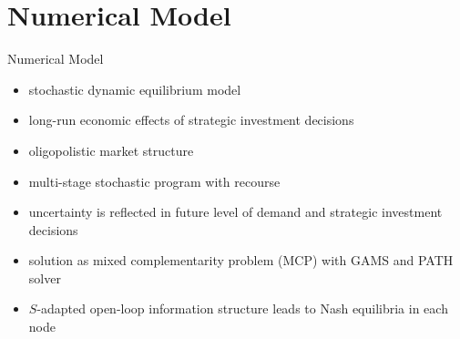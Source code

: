 \section{Numerical Model}

\begin{frame}{Numerical Model}
  \begin{itemize}
  \item stochastic dynamic equilibrium model
  \item long-run economic effects of strategic investment decisions
  \item oligopolistic market structure
  \end{itemize}
  \begin{itemize}
  \item multi-stage stochastic program with recourse
  \item uncertainty is reflected in future level of demand and strategic investment decisions 
  \item solution as mixed complementarity problem (MCP) with GAMS and PATH solver
   \item $S$-adapted open-loop information structure leads to Nash equilibria in each node 
  \end{itemize}
\end{frame}




